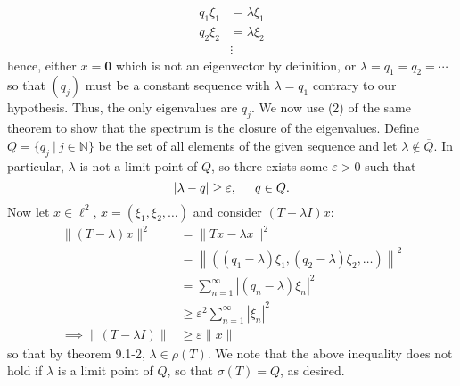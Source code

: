 \documentclass{article}
\begin{document}
\begin{itemize}
\begin{align*}
        q_1\xi_1 &= \lambda\xi_1\\
        q_2\xi_2 &= \lambda\xi_2\\
        &\vdots
    \end{align*}
    hence, either $x = \mathbf{0}$ which is not an eigenvector by definition, or $\lambda = q_1 = q_2 = \cdots$ so that $(q_j)$ must be a constant sequence with $\lambda = q_1$ contrary to our hypothesis. Thus, the only eigenvalues are $q_j$.
    We now use (2) of the same theorem to show that the spectrum is the closure of the eigenvalues. Define $Q = \{q_j \: | \: j \in \mathbb{N}\}$ be the set of all elements of the given sequence and let $\lambda \notin \overline{Q}$. In particular, $\lambda$ is not a limit point of $Q$, so there exists some $\varepsilon > 0$ such that
    \[|\lambda - q| \geq \varepsilon, \hspace{0.5cm} q\in Q.\]
    Now let $x \in \ell^2$, $x = (\xi_1, \xi_2,\dots)$ and consider $(T - \lambda I)x$:
    \begin{align*}
        \|(T - \lambda)x\|^2 &= \|Tx - \lambda x\|^2\\
        &= \left\|\left((q_1 - \lambda)\xi_1, (q_2 - \lambda)\xi_2, \dots\right)\right\|^2\\
        &= \sum_{n = 1}^{\infty} |(q_n - \lambda)\xi_n|^2\\
        &\geq \varepsilon^2\sum_{n = 1}^{\infty} |\xi_n|^2\\
        \implies \|(T - \lambda I)\| &\geq \varepsilon \|x\|
    \end{align*}
    so that by theorem 9.1-2, $\lambda \in \rho(T)$. We note that the above inequality does not hold if $\lambda$ is a limit point of $Q$, so that $\sigma(T) = \overline{Q}$, as desired.



\end{itemize}
\end{document}

